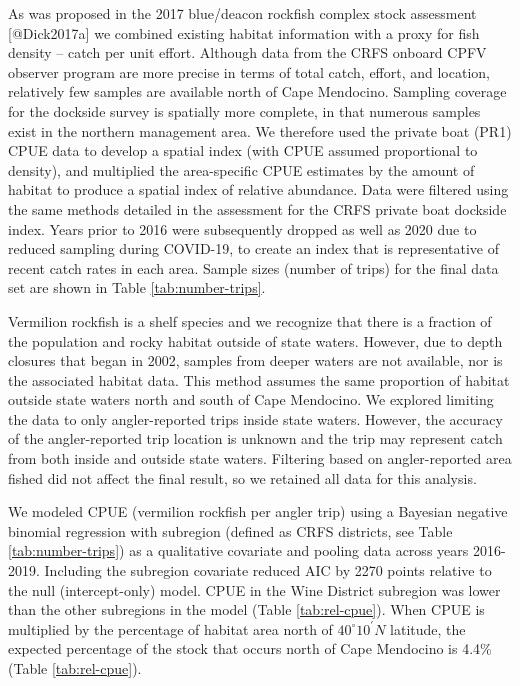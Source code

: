 \documentclass[
]{article}
\begin{document}
As was proposed in the 2017 blue/deacon rockfish complex stock assessment {[}@Dick2017a{]} we combined existing habitat information with a proxy for fish density -- catch per unit effort. Although data from the CRFS onboard CPFV observer
program are more precise in terms of total catch, effort, and location, relatively few
samples are available north of Cape Mendocino. Sampling coverage for the dockside
survey is spatially more complete, in that numerous samples exist in the northern
management area. We therefore used the private boat (PR1) CPUE data to develop a spatial
index (with CPUE assumed proportional to density), and multiplied the area-specific
CPUE estimates by the amount of habitat to produce a spatial index of relative abundance.
Data were filtered using the same methods detailed in the assessment for the CRFS
private boat dockside index. Years prior to 2016 were subsequently dropped as well as 2020 due to reduced sampling during COVID-19, to create an index that is representative of recent catch rates in each area. Sample sizes (number of trips) for the final data set are shown in Table \ref{tab:number-trips}.

Vermilion rockfish is a shelf species and we recognize that there is a fraction of the
population and rocky habitat outside of state waters. However, due to depth closures that began in 2002, samples from deeper waters are not available, nor is the associated habitat
data. This method assumes the same proportion of habitat outside state waters north and
south of Cape Mendocino. We explored limiting the data to only angler-reported trips inside state waters. However, the accuracy of the angler-reported trip location is unknown and the
trip may represent catch from both inside and outside state waters. Filtering based on
angler-reported area fished did not affect the final result, so we retained all data for this analysis.

We modeled CPUE (vermilion rockfish per angler trip) using a Bayesian negative binomial regression with subregion (defined as CRFS districts, see Table \ref{tab:number-trips}) as a qualitative covariate and
pooling data across years 2016-2019. Including the subregion covariate reduced AIC
by 2270 points relative to the null (intercept-only) model. CPUE in the Wine District subregion was lower than the other subregions in the model
(Table \ref{tab:rel-cpue}). When CPUE is multiplied by the percentage of habitat area north of $40^\circ 10^\prime N$ latitude, the expected percentage of the stock that occurs north of Cape Mendocino is 4.4\% (Table \ref{tab:rel-cpue}).
\end{document}
